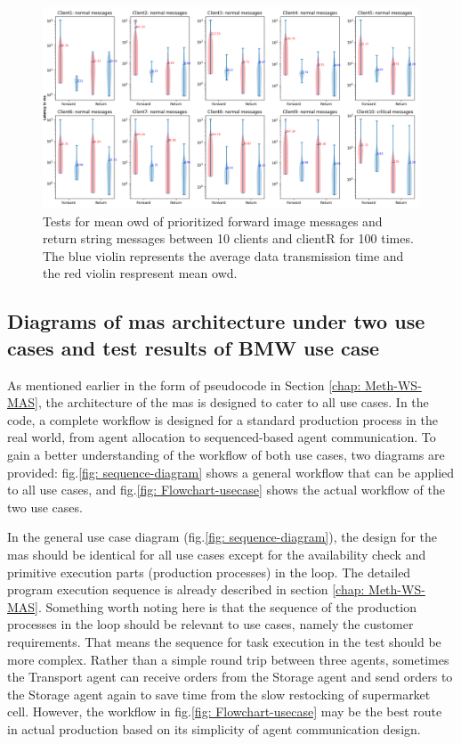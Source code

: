 \begin{figure}
    \centering
    \includegraphics[width=\textheight]{figures/tests/priority_tests/log_violin_10clients_image_priority.png}\hfill 
    \caption{Tests for mean \gls{owd} of prioritized forward image messages and return string messages between 10 clients 
    and clientR for 100 times. The blue violin represents the average data transmission time and the red violin 
    respresent mean \gls{owd}.} \label{fig: priority-10clients-d}
\end{figure}


\subsection{Diagrams of \gls{mas} architecture under two use cases and 
test results of BMW use case}\label{chap: Result-Internal-Usecase}

As mentioned earlier in the form of pseudocode in Section \ref{chap: Meth-WS-MAS}, 
the architecture of the \gls{mas} is designed to cater to all use cases. In the code, 
a complete workflow is designed for a standard production process in the real world, 
from agent allocation to sequenced-based agent communication. To gain a better 
understanding of the workflow of both use cases, two diagrams are provided: 
fig.\ref{fig: sequence-diagram} shows a general workflow that can be applied to all
use cases, and fig.\ref{fig: Flowchart-usecase} shows the actual workflow of the 
two use cases.


In the general use case diagram (fig.\ref{fig: sequence-diagram}), the 
design for the \gls{mas} should be identical for all use cases except for 
the availability check and primitive execution parts (production processes) in the loop. 
The detailed program execution sequence is already described in 
section \ref{chap: Meth-WS-MAS}. Something worth noting here is that the sequence 
of the production processes in the loop should be relevant to use cases, namely the 
customer requirements. That means the sequence for task execution in the test should 
be more complex. Rather than a simple round trip between three agents, sometimes the 
Transport agent can receive orders from the Storage agent and send orders to the Storage 
agent again to save time from the slow restocking of supermarket cell. However, 
the workflow in fig.\ref{fig: Flowchart-usecase} may be the best route in actual 
production based on its simplicity of agent communication design.  

